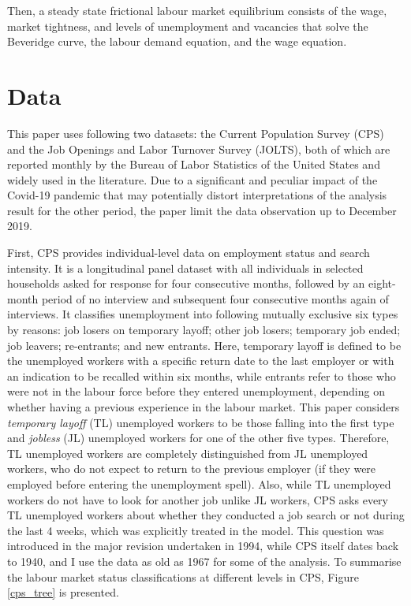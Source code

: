 \documentclass[a4paper, 11pt, tikz]{article}
\begin{document}
Then, a steady state frictional labour market equilibrium consists of the wage, market tightness, and levels of unemployment and vacancies that solve the Beveridge curve, the labour demand equation, and the wage equation.

\section{Data\label{data}}
This paper uses following two datasets: the Current Population Survey (CPS) and the Job Openings and Labor Turnover Survey (JOLTS), both of which are reported monthly by the Bureau of Labor Statistics of the United States and widely used in the literature.
Due to a significant and peculiar impact of the Covid-19 pandemic that may potentially distort interpretations of the analysis result for the other period, the paper limit the data observation up to December 2019.

First, CPS provides individual-level data on employment status and search intensity.
It is a longitudinal panel dataset with all individuals in selected households asked for response for four consecutive months, followed by an eight-month period of no interview and subsequent four consecutive months again of interviews.
It classifies unemployment into following mutually exclusive six types by reasons: job losers on temporary layoff; other job losers; temporary job ended; job leavers; re-entrants; and new entrants.
Here, temporary layoff is defined to be the unemployed workers with a specific return date to the last employer or with an indication to be recalled within six months, while entrants refer to those who were not in the labour force before they entered unemployment, depending on whether having a previous experience in the labour market.
This paper considers \textit{temporary layoff} (TL) unemployed workers to be those falling into the first type and \textit{jobless} (JL) unemployed workers for one of the other five types.
Therefore, TL unemployed workers are completely distinguished from JL unemployed workers, who do not expect to return to the previous employer (if they were employed before entering the unemployment spell).
Also, while TL unemployed workers do not have to look for another job unlike JL workers, CPS asks every TL unemployed workers about whether they conducted a job search or not during the last 4 weeks, which was explicitly treated in the \cite{gallant2020temporary} model.
This question was introduced in the major revision undertaken in 1994, while CPS itself dates back to 1940, and I use the data as old as 1967 for some of the analysis.
To summarise the labour market status classifications at different levels in CPS, Figure \ref{cps_tree} is presented.
\end{document}
